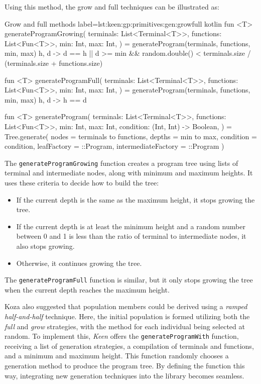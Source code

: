     Using this method, the grow and full techniques can be illustrated as:

    \begin{code}{Grow and full methods}{
        label=lst:keen:gp:primitives:gen:growfull
    }{kotlin}
        fun <T> generateProgramGrowing(
            terminals: List<Terminal<T>>,
            functions: List<Fun<T>>,
            min: Int,
            max: Int,
        ) = generateProgram(terminals, functions, min, max) { h, d ->
            d == h || d >= min 
                && random.double() < terminals.size / (terminals.size + functions.size)
        }

        fun <T> generateProgramFull(
            terminals: List<Terminal<T>>, functions: List<Fun<T>>, min: Int, max: Int,
        ) = generateProgram(terminals, functions, min, max) { h, d -> h == d }
        
        fun <T> generateProgram(
            terminals: List<Terminal<T>>,
            functions: List<Fun<T>>,
            min: Int,
            max: Int,
            condition: (Int, Int) -> Boolean,
        ) = Tree.generate(
            nodes = terminals to functions,
            depths = min to max,
            condition = condition,
            leafFactory = ::Program,
            intermediateFactory = ::Program
        )
    \end{code}

    The \texttt{generateProgramGrowing} function creates a program tree using lists of terminal and intermediate nodes, 
    along with minimum and maximum heights. It uses these criteria to decide how to build the tree:

    \begin{itemize}
        \item If the current depth is the same as the maximum height, it stops growing the tree.
        \item If the current depth is at least the minimum height and a random number between 0 and 1 is less than the 
            ratio of terminal to intermediate nodes, it also stops growing.
        \item Otherwise, it continues growing the tree.
    \end{itemize}

    The \texttt{generateProgramFull} function is similar, but it only stops growing the tree when the current depth 
    reaches the maximum height.

    Koza also suggested that population members could be derived using a \textit{ramped half-and-half} technique. Here, the initial population is 
    formed utilizing both the \textit{full} and \textit{grow} strategies, with the 
    method for each individual being selected at random. To implement this, 
    \textit{Keen} offers the \texttt{generateProgramWith} function, receiving a 
    list of generation strategies, a compilation of terminals and functions, and a 
    minimum and maximum height. This function randomly chooses a generation method 
    to produce the program tree. By defining the function this way, integrating 
    new generation techniques into the library becomes seamless.

